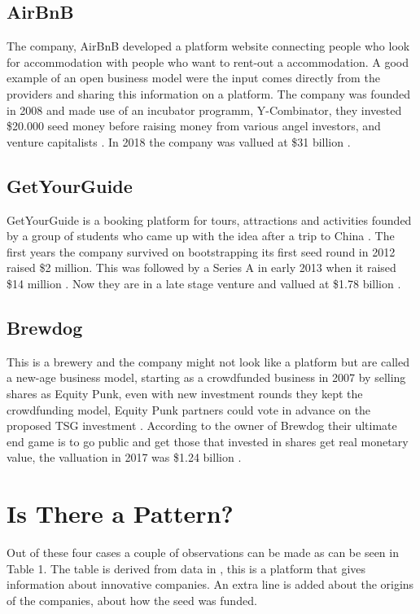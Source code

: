 \documentclass[a4paper, 11pt]{article}
\begin{document}
\subsection{AirBnB}
The company, AirBnB developed a platform website connecting people who look for accommodation with people who want to rent-out a accommodation. A good example of an open business model were the input comes directly from the providers and sharing this information on a platform. The company was founded in 2008 and made use of an incubator programm, Y-Combinator, they invested \$20.000 seed money before raising money from various angel investors, and venture capitalists \citep{mazzarini}. In 2018 the company was vallued at \$31 billion \citep{mazzarini}.

\subsection{GetYourGuide}
GetYourGuide is a booking platform for tours, attractions and activities founded by a group of students who came up with the idea after a trip to China \citep{getyourguide}. The first years the company survived on bootstrapping its first seed round in 2012 raised \$2 million. This was followed by a Series A in early 2013 when it raised \$14 million \citep{webintravel}. Now they are in a late stage venture and vallued at \$1.78 billion \citep{techcrunh}. 

\subsection{Brewdog}
This is a brewery and the company might not look like a platform but are called a new-age business model, starting as a crowdfunded business in 2007 by selling shares as Equity Punk, even with new investment rounds they kept the crowdfunding model, Equity Punk partners could vote in advance on the proposed TSG investment \citep{danziger}. According to the owner of Brewdog their ultimate end game is to go public and get those that invested in shares get real monetary value, the valluation in 2017 was \$1.24 billion \citep{danziger}.

\section{Is There a Pattern?}

Out of these four cases a couple of observations can be made as can be seen in Table 1. The table is derived from data in \cite{crunch}, this is a platform that gives information about innovative companies. An extra line is added about the origins of the companies, about how the seed was funded. 
\end{document}
